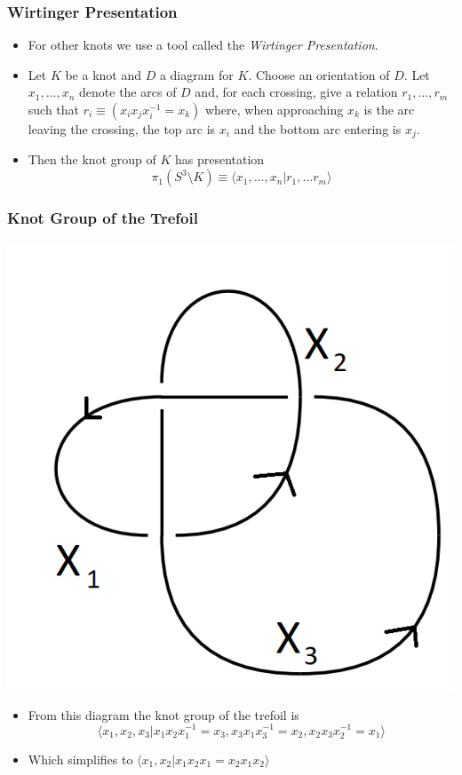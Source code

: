 \documentclass{beamer}
\begin{document}
\begin{frame}
  \frametitle{Wirtinger Presentation}
  \begin{itemize}
  \item For other knots we use a tool called the \textit{Wirtinger Presentation}.
    \pause
  \item Let $K$ be a knot and $D$ a diagram for $K$. Choose an orientation of $D$.
    Let $x_1,\ldots, x_n$ denote the arcs of $D$ and, for each crossing, give a
    relation $r_1,\ldots, r_m$ such that $r_i\equiv (x_i x_j x_i^{-1}=x_k)$ where, when approaching
    $x_k$ is the arc leaving the crossing, the top arc is $x_i$ and the bottom arc entering
    is $x_j$.
    \pause
  \item Then the knot group of $K$ has presentation
    \[
      \pi_1(S^3\setminus K) \equiv \langle x_1,\ldots, x_n| r_1,\ldots r_m\rangle
    \]
  \end{itemize}
\end{frame}

\begin{frame}
  \frametitle{Knot Group of the Trefoil}
  \begin{center}
    \includegraphics[scale=.25]{annotated-trefoil}
  \end{center}
  \begin{itemize}
  \item From this diagram the knot group of the trefoil is 
    \[
      \langle x_1,x_2,x_3|x_1x_2x_1^{-1}=x_3,x_3x_1x_3^{-1}=x_2,x_2x_3x_2^{-1}=x_1\rangle
    \]\pause
  \item Which simplifies to $\langle x_1,x_2|x_1 x_2 x_1= x_2 x_1 x_2\rangle$
  \end{itemize}
\end{frame}
\end{document}
